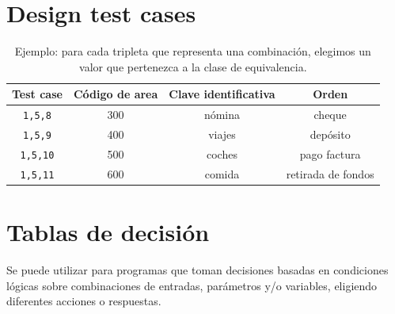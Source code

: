\newpage
\section{Design test cases}
\begin{table}[htbp]
   \centering
   \begin{tabular}{|c|c|c|c|}
      \hline
      \textbf{Test case}   & \textbf{Código de area}  & \textbf{Clave identificativa}  & \textbf{Orden}\\ \hline
      \texttt{1,5,8}       & 300             & nómina                & cheque \\ \hline
      \texttt{1,5,9}       & 400             & viajes                & depósito \\ \hline
      \texttt{1,5,10}      & 500             & coches                & pago factura \\ \hline
      \texttt{1,5,11}      & 600             & comida                & retirada de fondos \\ \hline
   \end{tabular}
   \caption{Ejemplo: para cada tripleta que representa una combinación, elegimos un valor que pertenezca a la clase
   de equivalencia.}
   \label{05/testCases}
\end{table}


\section{Tablas de decisión}

Se puede utilizar para programas que toman decisiones basadas en condiciones lógicas sobre combinaciones de entradas, parámetros y/o variables, eligiendo diferentes acciones o respuestas.

